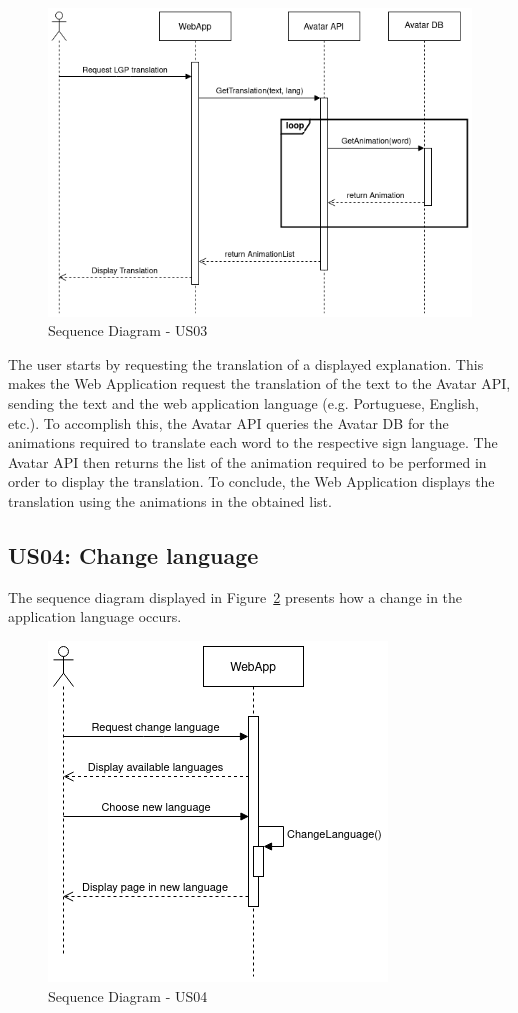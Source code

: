 \begin{figure}[H]
\centering
\includegraphics[scale=0.45]{ch4/assets/US03_SD.png}
\caption[Sequence Diagram US03]{Sequence Diagram - US03}
\label{fig:sdus03}
\end{figure}

The user starts by requesting the translation of a displayed explanation.
This makes the Web Application request the translation of the text to the Avatar API, sending the text and the web application language (e.g. Portuguese, English, etc.).
To accomplish this, the Avatar API queries the Avatar DB for the animations required to translate each word to the respective sign language.
The Avatar API then returns the list of the animation required to be performed in order to display the translation.
To conclude, the Web Application displays the translation using the animations in the obtained list.

\subsection{US04: Change language}

The sequence diagram displayed in Figure~\ref{fig:sdus04} presents how a change in the application language occurs.

\begin{figure}[H]
\centering
\includegraphics[scale=0.45]{ch4/assets/US04_SD.png}
\caption[Sequence Diagram US04]{Sequence Diagram - US04}
\label{fig:sdus04}
\end{figure}

